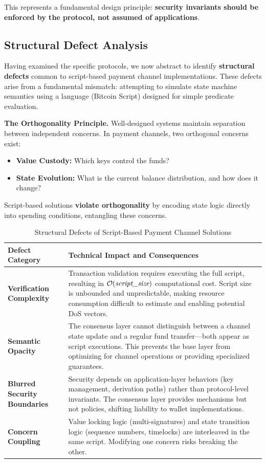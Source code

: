 This represents a fundamental design principle: \textbf{security invariants should be enforced by the protocol, not assumed of applications}.

\subsection{Structural Defect Analysis}

Having examined the specific protocols, we now abstract to identify \textbf{structural defects} common to script-based payment channel implementations. These defects arise from a fundamental mismatch: attempting to simulate state machine semantics using a language (Bitcoin Script) designed for simple predicate evaluation.

\textbf{The Orthogonality Principle.} Well-designed systems maintain separation between independent concerns. In payment channels, two orthogonal concerns exist:
\begin{itemize}
    \item \textbf{Value Custody:} Which keys control the funds?
    \item \textbf{State Evolution:} What is the current balance distribution, and how does it change?
\end{itemize}

Script-based solutions \textbf{violate orthogonality} by encoding state logic directly into spending conditions, entangling these concerns.

\begin{table}[htbp]
\centering
\caption{Structural Defects of Script-Based Payment Channel Solutions}
\label{tab:defects}
\small
\begin{tabularx}{\linewidth}{@{}p{2.8cm}X@{}}
\toprule
\textbf{Defect Category} & \textbf{Technical Impact and Consequences} \\
\midrule
\textbf{Verification Complexity} & Transaction validation requires executing the full script, resulting in $\mathcal{O}(\textit{script\_size})$ computational cost. Script size is unbounded and unpredictable, making resource consumption difficult to estimate and enabling potential DoS vectors. \\
\addlinespace
\textbf{Semantic Opacity} & The consensus layer cannot distinguish between a channel state update and a regular fund transfer---both appear as script executions. This prevents the base layer from optimizing for channel operations or providing specialized guarantees. \\
\addlinespace
\textbf{Blurred Security Boundaries} & Security depends on application-layer behaviors (key management, derivation paths) rather than protocol-level invariants. The consensus layer provides mechanisms but not policies, shifting liability to wallet implementations. \\
\addlinespace
\textbf{Concern Coupling} & Value locking logic (multi-signatures) and state transition logic (sequence numbers, timelocks) are interleaved in the same script. Modifying one concern risks breaking the other. \\
\bottomrule
\end{tabularx}
\end{table}

